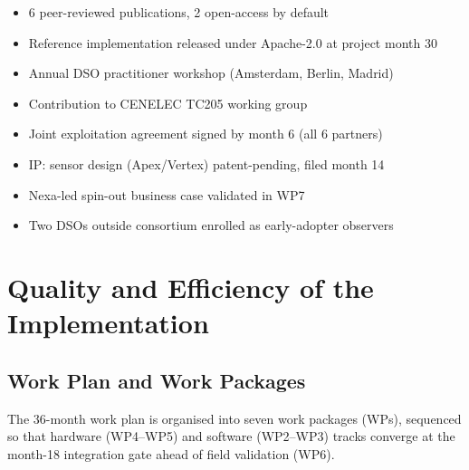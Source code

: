 \documentclass[11pt,a4paper,parskip=half]{scrreprt}
\begin{document}
\begin{minipage}{0.48\textwidth}
\begin{tcolorbox}[factbox={\faIcon{globe}\ \ Dissemination}]
\footnotesize
\begin{itemize}
  \item 6 peer-reviewed publications, 2 open-access by default
  \item Reference implementation released under Apache-2.0 at project month 30
  \item Annual DSO practitioner workshop (Amsterdam, Berlin, Madrid)
  \item Contribution to CENELEC TC205 working group
\end{itemize}
\end{tcolorbox}
\end{minipage}
\hfill
\begin{minipage}{0.48\textwidth}
\begin{tcolorbox}[factbox={\faIcon{handshake}\ \ Exploitation}]
\footnotesize
\begin{itemize}
  \item Joint exploitation agreement signed by month 6 (all 6 partners)
  \item IP: sensor design (Apex/Vertex) patent-pending, filed month 14
  \item Nexa-led spin-out business case validated in WP7
  \item Two DSOs outside consortium enrolled as early-adopter observers
\end{itemize}
\end{tcolorbox}
\end{minipage}

\chapter{Quality and Efficiency of the Implementation}

\section{Work Plan and Work Packages}

The 36-month work plan is organised into seven work packages (WPs), sequenced so that hardware
(WP4--WP5) and software (WP2--WP3) tracks converge at the month-18 integration gate ahead of
field validation (WP6).
\end{document}
